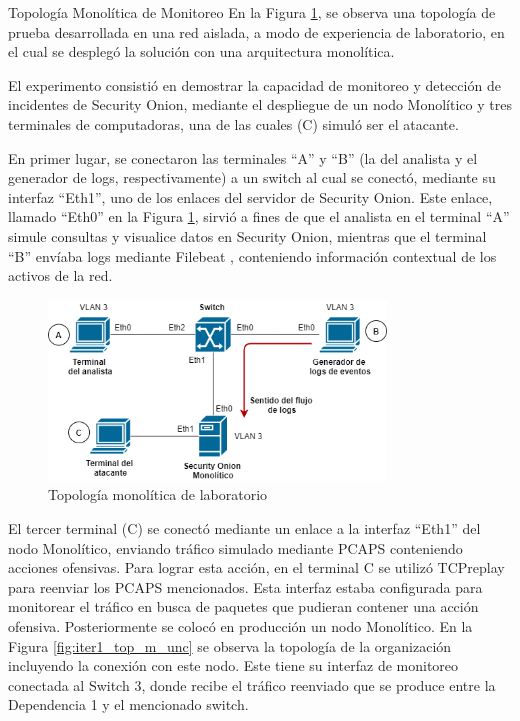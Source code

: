     \begin{subsection}{Topología Monolítica de Monitoreo}
    \label{subsec-topo-mono}
    En la Figura \ref{fig:figura_33_a}, se observa una topología de prueba desarrollada en una red aislada, a modo de experiencia de laboratorio, en el cual se desplegó la solución con una arquitectura monolítica.\par
    El experimento consistió en demostrar la capacidad de monitoreo y detección de incidentes de Security Onion, mediante el despliegue de un nodo Monolítico y tres terminales de computadoras, una de las cuales (C) simuló ser el atacante.\par
    En primer lugar, se conectaron las terminales “A” y “B” (la del analista y el generador de logs, respectivamente) a un switch al cual se conectó, mediante su interfaz “Eth1”, uno de los enlaces del servidor de Security Onion. Este enlace, llamado “Eth0” en la Figura \ref{fig:figura_33_a}, sirvió a fines de que el analista en el terminal “A” simule consultas y visualice datos en Security Onion, mientras que el terminal “B” envíaba logs mediante Filebeat \cite{filebeat}, conteniendo información contextual de los activos de la red. \par
    \begin{figure}[H]
    \centering
    \includegraphics[width=0.8\textwidth]{./iteracion_1_imagenes/figura_33_a_topologia_de_prueba_1.png}
    \caption{Topología monolítica de laboratorio}
    \label{fig:figura_33_a}
    \end{figure}
    El tercer terminal (C) se conectó mediante un enlace a la interfaz “Eth1” del nodo Monolítico, enviando tráfico simulado mediante PCAPS conteniendo acciones ofensivas. Para lograr esta acción, en el terminal C se utilizó TCPreplay \cite{tcpreplay} para reenviar los PCAPS mencionados. Esta interfaz estaba configurada para monitorear el tráfico en busca de paquetes que pudieran contener una acción ofensiva. 
    Posteriormente se colocó en producción un nodo Monolítico. En la Figura \ref{fig:iter1_top_m_unc} se observa la topología de la organización incluyendo la conexión con este nodo. Este tiene su interfaz de monitoreo conectada al Switch 3, donde recibe el tráfico reenviado que se produce entre la Dependencia 1 y el mencionado switch.

\end{subsection}
